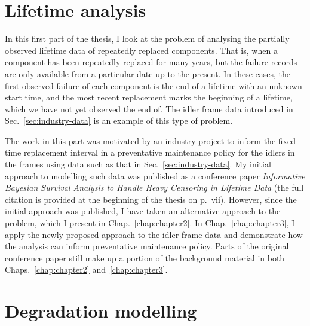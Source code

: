 \documentclass{mammoth}
\begin{document}
\frontmatter










\tableofcontents

\mainmatter



\part{Lifetime analysis}\label{part:one}

In this first part of the thesis, I look at the problem of analysing the partially observed lifetime data of repeatedly replaced components. That is, when a component has been repeatedly replaced for many years, but the failure records are only available from a particular date up to the present. In these cases, the first observed failure of each component is the end of a lifetime with an unknown start time, and the most recent replacement marks the beginning of a lifetime, which we have not yet observed the end of. The idler frame data introduced in Sec.~\ref{sec:industry-data} is an example of this type of problem.

The work in this part was motivated by an industry project to inform the fixed time replacement interval in a preventative maintenance policy for the idlers in the frames using data such as that in Sec.~\ref{sec:industry-data}. My initial approach to modelling such data was published as a conference paper \textit{Informative Bayesian Survival Analysis to Handle Heavy Censoring in Lifetime Data} (the full citation is provided at the beginning of the thesis on p.~vii). However, since the initial approach was published, I have taken an alternative approach to the problem, which I present in Chap.~\ref{chap:chapter2}. In Chap.~\ref{chap:chapter3}, I apply the newly proposed approach to the idler-frame data and demonstrate how the analysis can inform preventative maintenance policy. Parts of the original conference paper still make up a portion of the background material in both Chaps.~\ref{chap:chapter2} and~\ref{chap:chapter3}.




\part{Degradation modelling}\label{part:two}
\end{document}
